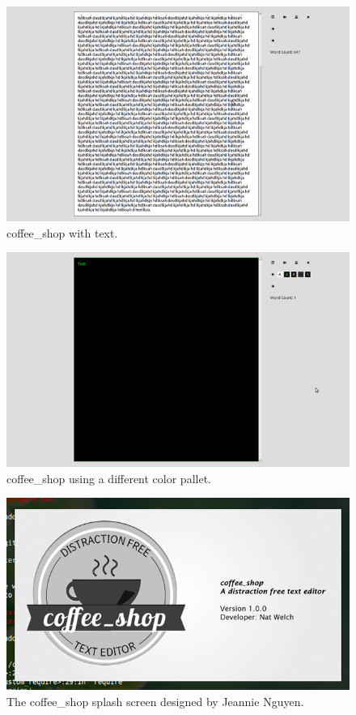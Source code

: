 \documentclass[10pt]{article}
\begin{document}
\begin{figure}
   \centering
      \includegraphics[width=130mm]{images/coffee_shop2.png}
   \caption{coffee\_shop with text.}
\end{figure}

\begin{figure}
   \centering
      \includegraphics[width=130mm]{images/coffee_shop3.png}
   \caption{coffee\_shop using a different color pallet.}
\end{figure}

\begin{figure}
   \centering
      \includegraphics[width=130mm]{images/coffee_shop4.png}
   \caption{The coffee\_shop splash screen designed by Jeannie Nguyen\protect\cite{jeannie}.}
\end{figure}
\end{document}
